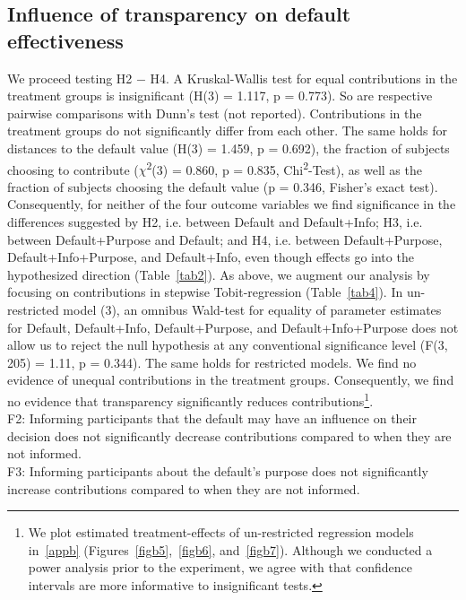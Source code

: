 \documentclass[review, authoryear,12pt]{elsarticle}
\begin{document}
\subsection{Influence of transparency on default effectiveness}
We proceed testing H2 $-$ H4. A Kruskal-Wallis test for equal contributions in the treatment groups is insignificant (H(3) = 1.117, p = 0.773). So are respective pairwise comparisons with Dunn's test (not reported). Contributions in the treatment groups do not significantly differ from each other. The same holds for distances to the default value (H(3) = 1.459, p = 0.692), the fraction of subjects choosing to contribute ($\chi$\textsuperscript{2}(3) = 0.860, p = 0.835, Chi\textsuperscript{2}-Test), as well as the fraction of subjects choosing the default value (p = 0.346, Fisher's exact test). Consequently, for neither of the four outcome variables we find significance in the differences suggested by H2, i.e. between Default and Default+Info; H3, i.e. between Default+Purpose and Default; and H4, i.e. between Default+Purpose, Default+Info+Purpose, and Default+Info, even though effects go into the hypothesized direction (Table~\ref{tab2}).
As above, we augment our analysis by focusing on contributions in stepwise Tobit-regression (Table~\ref{tab4}). In un-restricted model (3), an omnibus Wald-test for equality of parameter estimates for Default, Default+Info, Default+Purpose, and Default+Info+Purpose does not allow us to reject the null hypothesis at any conventional significance level (F(3, 205) = 1.11, p = 0.344). The same holds for restricted models. We find no evidence of unequal contributions in the treatment groups. Consequently, we find no evidence that transparency significantly reduces contributions\footnote{We plot estimated treatment-effects of un-restricted regression models in~\ref{appb} (Figures~\ref{figb5},~\ref{figb6}, and~\ref{figb7}). Although we conducted a power analysis prior to the experiment, we agree with \cite{Colegrave.2003} that confidence intervals are more informative to insignificant tests.}. \\

F2: Informing participants that the default may have an influence on their decision does not significantly decrease contributions compared to when they are not informed.\\

F3: Informing participants about the default's purpose does not significantly increase contributions compared to when they are not informed.\\
\end{document}
